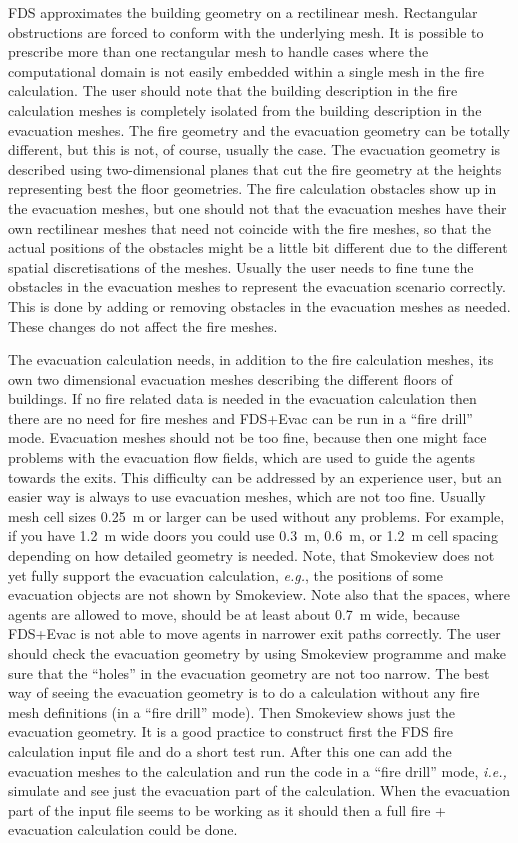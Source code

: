 \documentclass[12pt,a4paper,final,twoside]{stylevk}
\begin{document}
FDS approximates the building geometry on a rectilinear mesh.
Rectangular obstructions are forced to conform with the underlying
mesh.  It is possible to prescribe more than one rectangular mesh to
handle cases where the computational domain is not easily embedded
within a single mesh in the fire calculation.  The user should note
that the building description in the fire calculation meshes is
completely isolated from the building description in the evacuation
meshes.  The fire geometry and the evacuation geometry can be totally
different, but this is not, of course, usually the case.  The
evacuation geometry is described using two-dimensional planes that cut
the fire geometry at the heights representing best the floor
geometries.  The fire calculation obstacles show up in the evacuation
meshes, but one should not that the evacuation meshes have their own
rectilinear meshes that need not coincide with the fire meshes, so
that the actual positions of the obstacles might be a little bit
different due to the different spatial discretisations of the meshes.
Usually the user needs to fine tune the obstacles in the evacuation
meshes to represent the evacuation scenario correctly.  This is done
by adding or removing obstacles in the evacuation meshes as needed.
These changes do not affect the fire meshes.


The evacuation calculation needs, in addition to the fire calculation
meshes, its own two dimensional evacuation meshes describing the
different floors of buildings.  If no fire related data is needed in
the evacuation calculation then there are no need for fire meshes and
FDS+Evac can be run in a ``fire drill'' mode.  Evacuation meshes
should not be too fine, because then one might face problems with the
evacuation flow fields, which are used to guide the agents towards the
exits.  This difficulty can be addressed by an experience user, but an
easier way is always to use evacuation meshes, which are not too fine.
Usually mesh cell sizes 0.25~m or larger can be used without any
problems.  For example, if you have 1.2~m wide doors you could use
0.3~m, 0.6~m, or 1.2~m cell spacing depending on how detailed geometry
is needed.  Note, that Smokeview does not yet fully support the
evacuation calculation, \emph{e.g.}, the positions of some evacuation
objects are not shown by Smokeview.  Note also that the spaces, where
agents are allowed to move, should be at least about 0.7~m wide,
because FDS+Evac is not able to move agents in narrower exit paths
correctly.  The user should check the evacuation geometry by using
Smokeview programme and make sure that the ``holes'' in the evacuation
geometry are not too narrow.  The best way of seeing the evacuation
geometry is to do a calculation without any fire mesh definitions (in
a ``fire drill'' mode).  Then Smokeview shows just the evacuation
geometry.  It is a good practice to construct first the FDS fire
calculation input file and do a short test run.  After this one can
add the evacuation meshes to the calculation and run the code in a
``fire drill'' mode, \emph{i.e.,} simulate and see just the evacuation
part of the calculation.  When the evacuation part of the input file
seems to be working as it should then a full fire + evacuation
calculation could be done.
\end{document}
